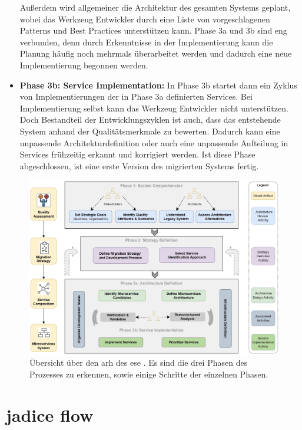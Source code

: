 \begin{itemize}
	Außerdem wird allgemeiner die Architektur des gesamten Systems geplant, wobei das Werkzeug Entwickler durch eine Liste von vorgeschlagenen Patterns und Best Practices unterstützen kann.
	 Phase 3a und 3b sind eng verbunden, denn durch Erkenntnisse in der Implementierung kann die Planung häufig noch mehrmals überarbeitet werden und dadurch eine neue Implementierung begonnen werden. 
	\item \textbf{Phase 3b: Service Implementation:} In Phase 3b startet dann ein Zyklus von Implementierungen der in Phase 3a definierten Services.
	Bei Implementierung selbst kann das Werkzeug Entwickler nicht unterstützen.
	Doch Bestandteil der Entwicklungszyklen ist auch, dass das entstehende System anhand der Qualitätsmerkmale zu bewerten.
	Dadurch kann eine unpassende Architekturdefinition oder auch eine unpassende Aufteilung in Services frühzeitig erkannt und korrigiert werden.
	Ist diese Phase abgeschlossen, ist eine erste Version des migrierten Systems fertig.
\end{itemize}

\begin{figure}
	\centering
	\includegraphics[width=\textwidth]{figures/ese-mmf-overview.png}
	\caption[Architecture Refactoring Helper Übersicht]{
		Übersicht über den \acrlong{arh} des \gls{ese} \cite{fritzsch2022architecturecentric}. Es sind die drei Phasen des Prozesses zu erkennen, sowie einige Schritte der einzelnen Phasen.
	}
	\label{fig:arh-overview}
\end{figure}

\section{jadice flow}

